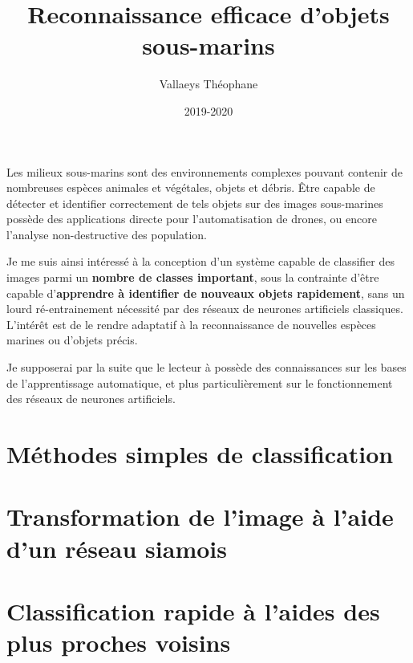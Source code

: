 \documentclass[a4paper,twoside]{article} %
\title{Reconnaissance efficace d’objets sous-marins}
\author{Vallaeys Théophane}
\date{2019-2020}
\begin{document}
	\maketitle
	
	Les milieux sous-marins sont des environnements complexes pouvant contenir de nombreuses espèces animales et végétales, objets et débris. Être capable de détecter et identifier correctement de tels objets sur des images sous-marines possède des applications directe pour l'automatisation de drones, ou encore l'analyse non-destructive des population.
	
	Je me suis ainsi intéressé à la conception d'un système capable de classifier des images parmi un \textbf{nombre de classes important}, sous la contrainte d'être capable d'\textbf{apprendre à identifier de nouveaux objets rapidement}, sans un lourd ré-entrainement nécessité par des réseaux de neurones artificiels classiques. L'intérêt est de le rendre adaptatif à la reconnaissance de nouvelles espèces marines ou d'objets précis.
	
	Je supposerai par la suite que le lecteur à possède des connaissances sur les bases de l'apprentissage automatique, et plus particulièrement sur le fonctionnement des réseaux de neurones artificiels.
	
	\tableofcontents
	
	\section{Méthodes simples de classification}
	
	
	
	\section{Transformation de l'image à l'aide d'un réseau siamois}
	
	\section{Classification rapide à l'aides des plus proches voisins}
	
	
	
\end{document}
